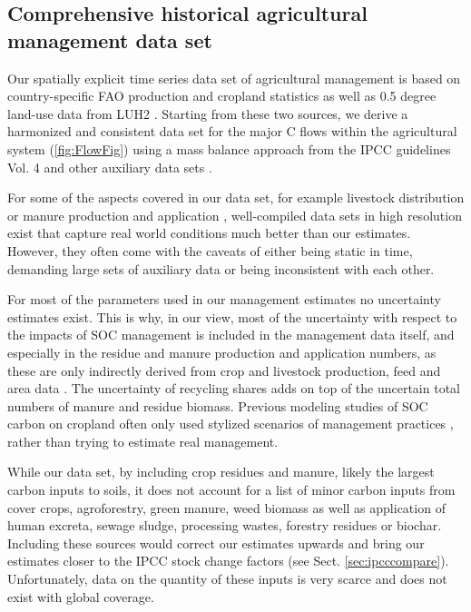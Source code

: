 \documentclass[gc, manuscript]{copernicus}
\begin{document}
\hypertarget{comprehensive-historical-agricultural-management-data-set}{%
\subsection{Comprehensive historical agricultural management data set}\label{comprehensive-historical-agricultural-management-data-set}}

Our spatially explicit time series data set of agricultural management is based on country-specific FAO production and cropland statistics \citep{faostat_faostat_2016} as well as 0.5 degree land-use data from LUH2 \citep{hurtt_harmonization_2020}. Starting from these two sources, we derive a harmonized and consistent data set for the major C flows within the agricultural system (\ref{fig:FlowFig}) using a mass balance approach from the IPCC guidelines Vol. 4 \citep{eggleston_ipcc_2006, calvo_buendia_ipcc_2019} and other auxiliary data sets \citep[e.g.~][]{porwollik_generating_2019}.

For some of the aspects covered in our data set, for example livestock distribution \citep{robinson_mapping_2014} or manure production and application \citep{zhang_global_2017}, well-compiled data sets in high resolution exist that capture real world conditions much better than our estimates. However, they often come with the caveats of either being static in time, demanding large sets of auxiliary data or being inconsistent with each other.

For most of the parameters used in our management estimates no uncertainty estimates exist. This is why, in our view, most of the uncertainty with respect to the impacts of SOC management is included in the management data itself, and especially in the residue and manure production and application numbers, as these are only indirectly derived from crop and livestock production, feed and area data \citep{faostat_faostat_2016, weindl_livestock_2017}. The uncertainty of recycling shares adds on top of the uncertain total numbers of manure and residue biomass. Previous modeling studies of SOC carbon on cropland often only used stylized scenarios of management practices \citep{pugh_simulated_2015, lutz_simulating_2019}, rather than trying to estimate real management.

While our data set, by including crop residues and manure, likely the largest carbon inputs to soils, it does not account for a list of minor carbon inputs from cover crops, agroforestry, green manure, weed biomass as well as application of human excreta, sewage sludge, processing wastes, forestry residues or biochar. Including these sources would correct our estimates upwards and bring our estimates closer to the IPCC stock change factors (see Sect. \ref{sec:ipcccompare}). Unfortunately, data on the quantity of these inputs is very scarce and does not exist with global coverage.
\end{document}
